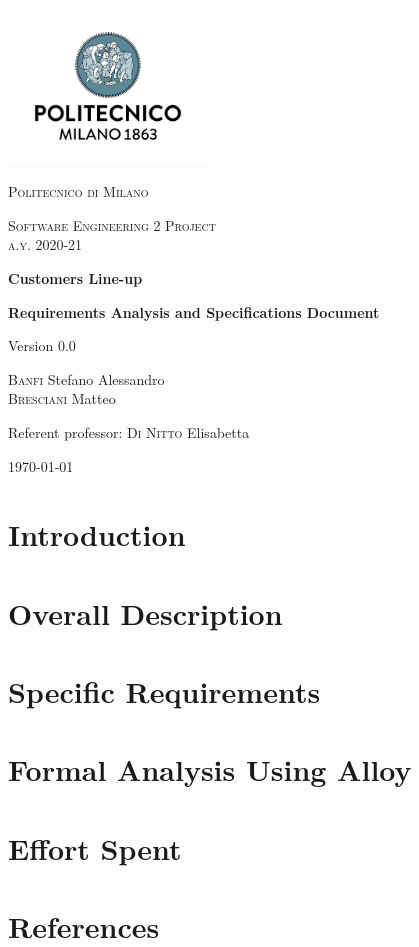 \documentclass[fontsize=11pt,paper=a4,pagesize=auto]{report}
\begin{document}
\begin{titlepage}
	\centering
	\includegraphics[width=150pt]{images/polimi.jpg}\par\vspace{1cm}
	{\scshape\LARGE
		Politecnico di Milano\par}
	\vspace{1cm}
	{\scshape\Large
		Software Engineering 2 Project\\
		a.y. 2020-21\par}
	\vspace{1.5cm}
	{\huge\bfseries
		Customers Line-up\\\par}
	{\Large\bfseries
		Requirements Analysis and Specifications Document\par}
	Version 0.0\par
	\vspace{2cm}
	{\Large
		{\scshape Banfi}  Stefano Alessandro\\
		{\scshape Bresciani} Matteo\par}
	\vfill
	Referent professor: {\scshape Di Nitto} Elisabetta\par
	\vfill
	{\large\today\par}
\end{titlepage}



\tableofcontents
\chapter{Introduction}



\chapter{Overall Description}



\chapter{Specific Requirements}





\chapter{Formal Analysis Using Alloy}



\chapter{Effort Spent}



\chapter{References}

\end{document}
